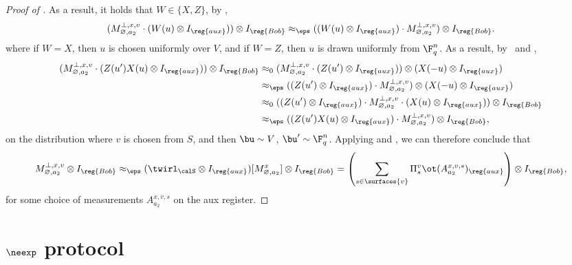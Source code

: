 \begin{proof}[Proof of ]
As a result, it holds that $W \in \{X,Z\}$, by , 
\begin{equation*}
(M_{\varnothing, a_2}^{\bot, x , v}\cdot (W(u)\otimes I_{\reg{aux}})) \otimes I_{\reg{Bob}}
\approx_{\eps} ((W(u)\otimes I_{\reg{aux}}) \cdot M_{\varnothing,
  a_2}^{\bot, x, v}) \otimes I_{\reg{Bob}}.
\end{equation*}
where if $W = X$, then $u$ is chosen uniformly over $V$, and
if $W = Z$, then $u$ is drawn uniformly from $\F_q^n$.
As a result, by~ and ,
\begin{align*}
(M_{\varnothing, a_2}^{\bot, x, v} \cdot (Z(u') X(u)\otimes I_{\reg{aux}})) \otimes I_{\reg{Bob}}
& \approx_{0}(M_{\varnothing, a_2}^{\bot,x,v} \cdot (Z(u')\otimes I_{\reg{aux}})) \otimes (X(-u)\otimes I_{\reg{aux}})\\
& \approx_{\eps}((Z(u')\otimes I_{\reg{aux}}) \cdot M_{\varnothing, a_2}^{\bot,x,v}) \otimes (X(-u)\otimes I_{\reg{aux}})\\
& \approx_{0}((Z(u')\otimes I_{\reg{aux}} )\cdot M_{\varnothing,a_2}^{\bot,x,v} \cdot (X(u) \otimes I_{\reg{aux}})) \otimes I_{\reg{Bob}}\\
& \approx_{\eps}((Z(u') X(u)\otimes I_{\reg{aux}}) \cdot
                                                                                                                                    M_{\varnothing,
                                                                                                                                    a_2}^{\bot,x,
                                                                                                                                    v})
                                                                                                                                    \otimes I_{\reg{Bob}},
\end{align*}
on the distribution where $v$ is chosen from $S$, and then $\bu \sim V$, $\bu' \sim \F_q^n$.
Applying  and ,
we can therefore conclude that
\begin{equation*}
M_{\varnothing, a_2}^{\bot, x,v} \otimes I_{\reg{Bob}}
\approx_{\eps} (\twirl_{\calS} \otimes I_{\reg{aux}})[M_{\varnothing, a_2}^x]
\otimes I_{\reg{Bob}}
= \left(\sum_{s \in \surfaces{v}} \Pi^{v}_s \ot (A^{x,v,s}_{a_2})_{\reg{aux}}\right)
\otimes I_{\reg{Bob}}, 
\end{equation*}
for some choice of measurements $A^{x,v,s}_{a_2}$ on the aux register.
\end{proof}


\part{$\neexp$ protocol}

\label{part:neexp}


